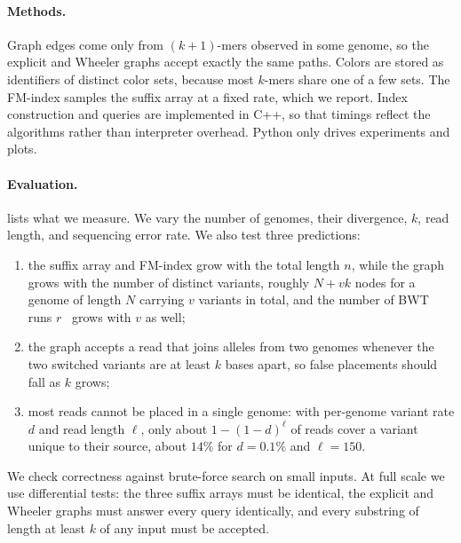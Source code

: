 \documentclass[a4paper,11pt]{article}
\theoremstyle{definition}
\begin{document}
\paragraph{Methods.} Graph edges come only from $(k+1)$-mers observed in some genome, so the explicit and Wheeler graphs accept exactly the same paths. Colors are stored as identifiers of distinct color sets, because most $k$-mers share one of a few sets. The FM-index samples the suffix array at a fixed rate, which we report. Index construction and queries are implemented in C++, so that timings reflect the algorithms rather than interpreter overhead. Python only drives experiments and plots.

\paragraph{Evaluation.}  lists what we measure. We vary the number of genomes, their divergence, $k$, read length, and sequencing error rate. We also test three predictions:
\begin{enumerate}[label=(\roman*), leftmargin=2em, itemsep=1pt]
\item the suffix array and FM-index grow with the total length $n$, while the graph grows with the number of distinct variants, roughly $N + vk$ nodes for a genome of length $N$ carrying $v$ variants in total, and the number of BWT runs $r$~\cite{10.1145/3375890} grows with $v$ as well;
\item the graph accepts a read that joins alleles from two genomes whenever the two switched variants are at least $k$ bases apart, so false placements should fall as $k$ grows;
\item most reads cannot be placed in a single genome: with per-genome variant rate $d$ and read length $\ell$, only about $1-(1-d)^{\ell}$ of reads cover a variant unique to their source, about $14\%$ for $d=0.1\%$ and $\ell=150$.
\end{enumerate}
We check correctness against brute-force search on small inputs. At full scale we use differential tests: the three suffix arrays must be identical, the explicit and Wheeler graphs must answer every query identically, and every substring of length at least $k$ of any input must be accepted.
\end{document}
